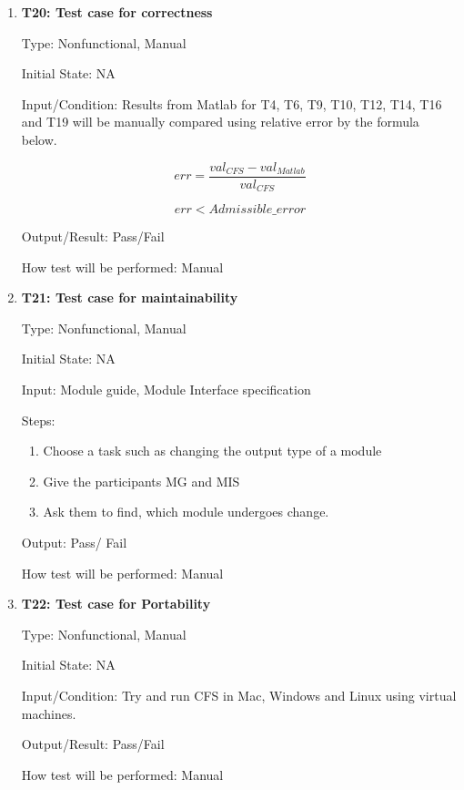 \documentclass[12pt, titlepage]{article}
\newcommand{\famname}{CFS} %
\begin{document}
\begin{enumerate}
\item{\textbf{T20: Test case for correctness}\\}

Type: Nonfunctional, Manual
					
Initial State: NA
					
Input/Condition: Results from Matlab for T4, T6, T9, T10, T12, T14, T16 and T19 will be manually compared using relative error by the formula below.

\begin{equation*}
err = \frac{val_{CFS} - val_{Matlab}}{val_{CFS}}
\end{equation*}

\begin{equation*}
err < Admissible\_error
\end{equation*}
					
Output/Result: Pass/Fail
					
How test will be performed: Manual
				

				
\item{\textbf{T21: Test case for maintainability}\\}

Type: Nonfunctional, Manual
					
Initial State: NA
					
Input: Module guide, Module Interface specification

Steps: 
\begin{enumerate}
	\item Choose a task such as changing the output type of a module
	\item Give the participants MG and MIS
	\item Ask them to find, which module undergoes change.
\end{enumerate}
					
Output: Pass/ Fail
					
How test will be performed: Manual



\item{\textbf{T22: Test case for Portability}\\}

Type: Nonfunctional, Manual

Initial State: NA

Input/Condition: Try and run \famname{} in Mac, Windows and Linux using virtual machines.

Output/Result: Pass/Fail

How test will be performed: Manual

\end{enumerate}
\end{document}
